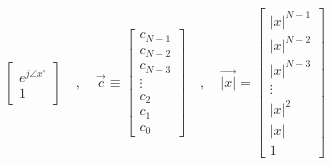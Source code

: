 \documentclass{article}
\begin{document}
\begin{align*}
\begin{bmatrix}
                                                        e^{j\angle{x}^{\circ}} \\
                                                        1
                                                      \end{bmatrix} \quad , \quad \vec{c} \equiv \begin{bmatrix}
                                                                                                    c_{N - 1} \\
                                                                                                    c_{N - 2} \\
                                                                                                    c_{N - 3} \\
                                                                                                    \vdots \\
                                                                                                    c_{2} \\
                                                                                                    c_{1} \\
                                                                                                    c_{0}
                                                                                                  \end{bmatrix} \quad , \quad \vec{|x|} = \begin{bmatrix}
                                                                                                                                                |x|^{N - 1} \\
                                                                                                                                                |x|^{N - 2} \\
                                                                                                                                                |x|^{N - 3} \\
                                                                                                                                                \vdots \\
                                                                                                                                                |x|^{2} \\
                                                                                                                                                |x| \\
                                                                                                                                                1
                                                                                                                                            \end{bmatrix} \\
\end{align*}
\end{document}
